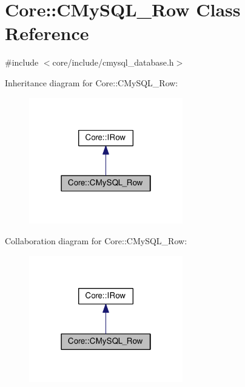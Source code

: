 \hypertarget{classCore_1_1CMySQL__Row}{}\section{Core\+:\+:C\+My\+S\+Q\+L\+\_\+\+Row Class Reference}
\label{classCore_1_1CMySQL__Row}


{\ttfamily \#include $<$core/include/cmysql\+\_\+database.\+h$>$}



Inheritance diagram for Core\+:\+:C\+My\+S\+Q\+L\+\_\+\+Row\+:\nopagebreak
\begin{figure}[H]
\begin{center}
\leavevmode
\includegraphics[width=190pt]{classCore_1_1CMySQL__Row__inherit__graph}
\end{center}
\end{figure}


Collaboration diagram for Core\+:\+:C\+My\+S\+Q\+L\+\_\+\+Row\+:\nopagebreak
\begin{figure}[H]
\begin{center}
\leavevmode
\includegraphics[width=190pt]{classCore_1_1CMySQL__Row__coll__graph}
\end{center}
\end{figure}
